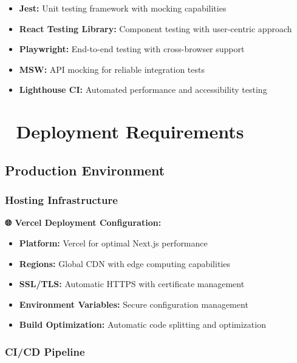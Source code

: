 \documentclass[12pt,a4paper]{article}
\begin{document}
\begin{itemize}
    \item \textbf{Jest:} Unit testing framework with mocking capabilities
    \item \textbf{React Testing Library:} Component testing with user-centric approach
    \item \textbf{Playwright:} End-to-end testing with cross-browser support
    \item \textbf{MSW:} API mocking for reliable integration tests
    \item \textbf{Lighthouse CI:} Automated performance and accessibility testing
\end{itemize}

\section{🚀 Deployment Requirements}

\subsection{Production Environment}

\subsubsection{Hosting Infrastructure}

\begin{tcolorbox}[colback=jupiterBlue!10,colframe=jupiterBlue]
\textbf{🌐 Vercel Deployment Configuration:}
\begin{itemize}
    \item \textbf{Platform:} Vercel for optimal Next.js performance
    \item \textbf{Regions:} Global CDN with edge computing capabilities
    \item \textbf{SSL/TLS:} Automatic HTTPS with certificate management
    \item \textbf{Environment Variables:} Secure configuration management
    \item \textbf{Build Optimization:} Automatic code splitting and optimization
\end{itemize}
\end{tcolorbox}

\subsubsection{CI/CD Pipeline}
\end{document}
